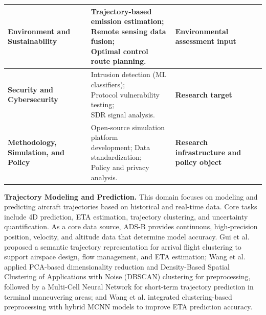\begin{table}[htbp]
\begin{tabular}{p{3.5cm} p{4.5cm} p{3.5cm}}
		\textbf{Environment and Sustainability} &
		\makecell[l]{
			Trajectory-based emission estimation;\\
			Remote sensing data fusion;\\
			Optimal control route planning.
		} &
		\textbf{Environmental assessment input} \\
		\hline
		
		\textbf{Security and Cybersecurity} &
		\makecell[l]{
			Intrusion detection (ML classifiers);\\
			Protocol vulnerability testing;\\
			SDR signal analysis.
		} &
		\textbf{Research target} \\
		\hline
		
		\textbf{Methodology, Simulation, and Policy} &
		\makecell[l]{
			Open-source simulation platform\\ development; 
			Data standardization;\\
			Policy and privacy analysis.
		} &
		\textbf{Research infrastructure and policy object} \\
		\hline
	\end{tabular}
	\label{tb:8categories}
\end{table}

\textbf{Trajectory Modeling and Prediction.} 
This domain focuses on modeling and predicting aircraft trajectories based on historical and real-time data. Core tasks include 4D prediction, ETA estimation, trajectory clustering, and uncertainty quantification. As a core data source, ADS-B provides continuous, high-precision position, velocity, and altitude data that determine model accuracy. Gui et al. \cite{xuhao2021trajectory} proposed a semantic trajectory representation for arrival flight clustering to support airspace design, flow management, and ETA estimation; Wang et al. \cite{wang2017short} applied PCA-based dimensionality reduction and Density-Based Spatial Clustering of Applications with Noise (DBSCAN) clustering for preprocessing, followed by a Multi-Cell Neural Network for short-term trajectory prediction in terminal maneuvering areas; and Wang et al. \cite{wang2018hybrid} integrated clustering-based preprocessing with hybrid MCNN models to improve ETA prediction accuracy.

